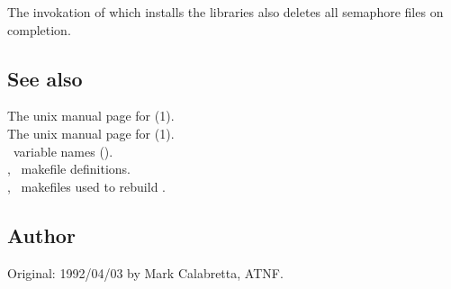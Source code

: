 \noindent
The invokation of  which installs the libraries also deletes
all semaphore files on completion.

\subsection*{See also}

The unix manual page for (1).\\
The unix manual page for (1).\\
\aipspp\ variable names ().\\
, \aipspp\ makefile definitions.\\
, \gnu\ makefiles used to rebuild \aipspp.

\subsection*{Author}

Original: 1992/04/03 by Mark Calabretta, ATNF.
